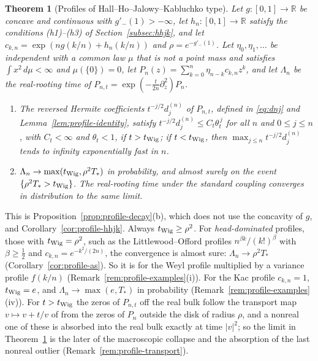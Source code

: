 \documentclass[11pt]{amsart}
\newtheorem{theorem}{Theorem}[section]
\theoremstyle{definition}
\theoremstyle{remark}
\numberwithin{equation}{section}
\newcommand{\R}{\mathbb{R}}
\begin{document}
\begin{theorem}[Profiles of Hall--Ho--Jalowy--Kabluchko type]\label{thm:profiles-intro}
Let $g:[0,1]\to\R$ be concave and continuous with $g'_-(1)>-\infty$, let $h_n:[0,1]\to\R$ satisfy the conditions \textup{(h1)--(h3)} of Section~\ref{subsec:hhjk}, and let $c_{k,n}=\exp(ng(k/n)+h_n(k/n))$ and $\rho=e^{-g'_-(1)}$. Let $\eta_0,\eta_1,\dots$ be independent with a common law $\mu$ that is not a point mass and satisfies $\int x^2\,d\mu<\infty$ and $\mu(\{0\})=0$, let $P_n(z)=\sum_{k=0}^{n}\eta_{n-k}c_{k,n}z^k$, and let $\Lambda_n$ be the real-rooting time of $P_{n,t}=\exp(-\frac t{2n}\partial_z^2)P_n$.
\begin{enumerate}
\item[(a)] The reversed Hermite coefficients $t^{-j/2}d^{(n)}_j$ of $P_{n,t}$, defined in \eqref{eq:dnj} and Lemma~\ref{lem:profile-identity}, satisfy $t^{-j/2}d^{(n)}_j\le C_t\theta_t^{\,j}$ for all $n$ and $0\le j\le n$, with $C_t<\infty$ and $\theta_t<1$, if $t>t_{\rm Wig}$; if $t<t_{\rm Wig}$, then $\max_{j\le n}t^{-j/2}d^{(n)}_j$ tends to infinity exponentially fast in $n$.
\item[(b)] $\Lambda_n\to\max(t_{\rm Wig},\rho^2T_*)$ in probability, and almost surely on the event $\{\rho^2T_*>t_{\rm Wig}\}$. The real-rooting time under the standard coupling converges in distribution to the same limit.
\end{enumerate}
\end{theorem}

This is Proposition~\ref{prop:profile-decay}(b), which does not use the concavity of $g$, and Corollary~\ref{cor:profile-hhjk}. Always $t_{\rm Wig}\ge\rho^2$. For \emph{head-dominated} profiles, those with $t_{\rm Wig}=\rho^2$, such as the Littlewood--Offord profiles $n^{\beta k}/(k!)^\beta$ with $\beta\ge\frac12$ and $c_{k,n}=e^{-k^2/(2n)}$, the convergence is almost sure: $\Lambda_n\to\rho^2T_*$ (Corollary~\ref{cor:profile-as}). So it is for the Weyl profile multiplied by a variance profile $f(k/n)$ (Remark~\ref{rem:profile-examples}(i)). For the Kac profile $c_{k,n}=1$, $t_{\rm Wig}=e$, and $\Lambda_n\to\max(e,T_*)$ in probability (Remark~\ref{rem:profile-examples}(iv)). For $t>t_{\rm Wig}$ the zeros of $P_{n,t}$ off the real bulk follow the transport map $v\mapsto v+t/v$ of \cite{HHJK} from the zeros of $P_n$ outside the disk of radius $\rho$, and a nonreal one of these is absorbed into the real bulk exactly at time $|v|^2$; so the limit in Theorem~\ref{thm:profiles-intro} is the later of the macroscopic collapse and the absorption of the last nonreal outlier (Remark~\ref{rem:profile-transport}).
\end{document}
